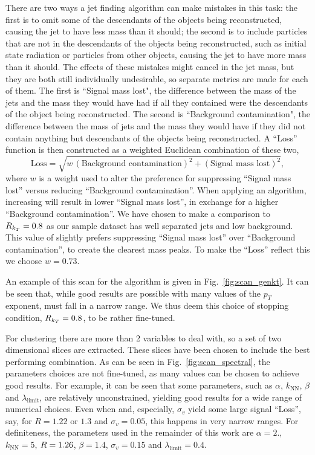 There are two ways a jet finding algorithm can make mistakes in this task:
the first is to omit some of the descendants of the objects being reconstructed, causing the jet to have less mass than it should;
the second is to include particles that are not in the descendants of the objects being reconstructed, such as initial state radiation or particles from other objects,
causing the jet to have more mass than it should.
The effects of these mistakes might cancel in the jet mass,
but they are both still individually undesirable,
so separate metrics are made for each of them.
The first is ``Signal mass lost", the difference between the mass of the jets and the mass they would have had if all they contained were the descendants of the object being reconstructed.
The second is ``Background contamination", the difference between the mass of jets and the mass they would have if they did not contain anything but descendants of the objects being reconstructed.
A ``Loss'' function is then constructed as a weighted Euclidean combination of these two,
\begin{equation}\label{eqn:loss}
\text{Loss} = \sqrt{w\,(\text{Background contamination})^2 + (\text{Signal mass lost})^2},
\end{equation}
where \(w\) is a weight used to alter the preference for suppressing ``Signal mass lost'' versus reducing ``Background contamination''.
When applying an \antikt{} algorithm, increasing \ktstoppingdeltar{} will result in lower ``Signal mass lost'', in exchange for a higher ``Background contamination''.
We have chosen to make a comparison to \(R_{k_T}{}=0.8\) as our sample dataset has well separated jets and low background.
This value of \ktstoppingdeltar{} slightly prefers suppressing ``Signal mass lost'' over ``Background contamination'',
to create the clearest mass peaks.
To make the ``Loss'' reflect this we choose \(w = 0.73\).

An example of this scan for the \genkt{} algorithm is given in Fig.~\ref{fig:scan_genkt}. 
It can be seen that, while good results are possible with many values of the \(p_T\) exponent,
                \ktstoppingdeltar{} must fall in a narrow range. We thus deem this choice of  stopping condition, \(R{}_{k_T}=0.8\), to be rather fine-tuned.

For \spectral{} clustering there are more than 2 variables to deal with, 
so a set of two dimensional slices are extracted. 
These slices have been chosen to include the best performing combination.
    As can be seen in Fig.~\ref{fig:scan_spectral}, the parameters choices are not fine-tuned,
    as many values can be chosen to achieve good results.
    For example, it can be seen that some parameters, such as \(\alpha\), \(k_\text{NN}\), \(\beta\)
    and \(\lambda_\text{limit}\), are relatively unconstrained,
    yielding  good results for a wide range of numerical choices.
    Even when \stoppingdeltar{} and, especially, \(\sigma_v\) yield some large signal ``Loss'',
    say, for \(R=1.22\) or \(1.3\) and \(\sigma_v=0.05\), this happens in very narrow ranges. 
    For definiteness, the
    parameters used in the remainder of this work are \(\alpha=2.\), \(k_\text{NN}=5\), \(R{} = 1.26\), \(\beta = 1.4\), \(\sigma_v = 0.15\) and \(\lambda_\text{limit} = 0.4\).

